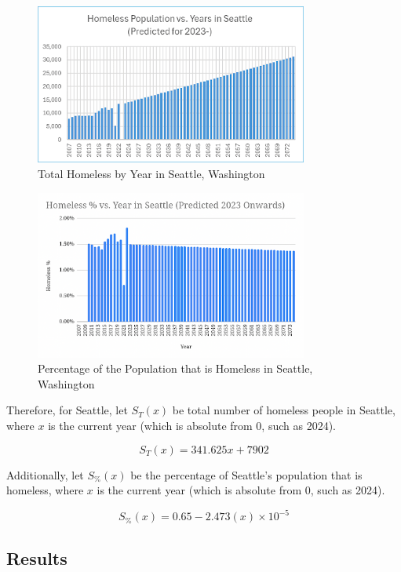 \documentclass[12pt]{article}
\begin{document}
\begin{figure}[H]
  \centering
  \includegraphics[width=0.8\textwidth]{homeless-vs-year-seattle}
  \caption{Total Homeless by Year in Seattle, Washington}
\end{figure}

\begin{figure}[H]
  \centering
  \includegraphics[width=0.8\textwidth]{homeless-prop-vs-year-seattle}
  \caption{Percentage of the Population that is Homeless in Seattle, Washington}
\end{figure}

\noindent
Therefore, for Seattle, let $S_{T}(x)$ be total number of homeless people in Seattle, where $x$ is the current year (which is absolute from 0, such as 2024).

$$S_{T}(x) = 341.625x + 7902$$

\noindent
Additionally, let $S_{\%}(x)$ be the percentage of Seattle's population that is homeless, where $x$ is the current year (which is absolute from 0, such as 2024).

$$S_{\%}(x) = 0.65 - 2.473(x) \times 10^{-5}$$

\subsection{Results}
\end{document}
